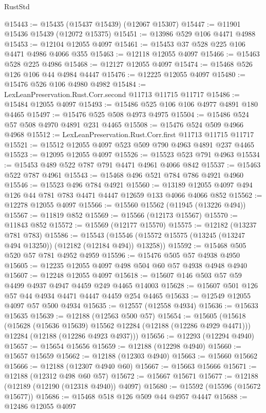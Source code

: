 \begin{lexlean}{RustStd}
\begin{coremodule}
{\begin{coremodule}
{{{{{{{{{{{{{{{{{{{{{{{{{{{{{{{{{{{{{{{{{{{{{{{{{{{{{{{{{{{{{{{{{{{{@15443 := @15435 (@15437 @15439) (@12067 @15307)
@15447 := @11901 @15436 @15439 (@12072 @15375)
@15451 := @13986 @529 @106 @4471 @4988
@15453 := @12104 @12055 @4097
@15461 := @15453 @37 @528 @225 @106 @4471 @4986 @4066 @355
@15463 := @12118 @12055 @4097
@15466 := @15463 @528 @225 @4986
@15468 := @12127 @12055 @4097
@15474 := @15468 @526 @126 @106 @44 @4984 @4447
@15476 := @12225 @12055 @4097
@15480 := @15476 @526 @106 @4980 @4982
@15484 := LexLeanPreservation.Rust.Corr.second @11713 @11715 @11717
@15486 := @15484 @12055 @4097
@15493 := @15486 @525 @106 @106 @4977 @4891 @180 @4465
@15497 := @15476 @525 @508 @4973 @4975
@15504 := @15486 @524 @57 @508 @4970 @4891 @231 @4465
@15508 := @15476 @524 @509 @4966 @4968
@15512 := LexLeanPreservation.Rust.Corr.first @11713 @11715 @11717
@15521 := @15512 @12055 @4097 @523 @509 @790 @4963 @4891 @237 @4465
@15523 := @12095 @12055 @4097
@15526 := @15523 @523 @791 @4963
@15534 := @15453 @489 @522 @787 @791 @4471 @4961 @4066 @842
@15537 := @15463 @522 @787 @4961
@15543 := @15468 @496 @521 @784 @786 @4921 @4960
@15546 := @15523 @496 @784 @4921
@15560 := @13189 @12055 @4097 @494 @126 @44 @781 @783 @4471 @4447 @12659 @133 @4066 @4066 @852
@15562 := @12278 @12055 @4097
@15566 := @15560 @15562 (@11945 (@13226 @494))
@15567 := @11819 @852
@15569 := @15566 (@12173 @15567)
@15570 := @11843 @852
@15572 := @15569 (@12177 @15570)
@15575 := @12182 (@13237 @781 @783)
@15586 := @15543
    (@15546 (@15572 @15575 (@13245 (@13247 @494 @13250)) (@12182 (@12184 @494)) @13258))
@15592 := @15468 @505 @520 @57 @781 @4952 @4959
@15596 := @15476 @505 @57 @4938 @4950
@15605 := @12235 @12055 @4097 @498 @504 @60 @57 @4938 @4948 @4940
@15607 := @12248 @12055 @4097
@15618 := @15607 @146 @503 @57 @59 @4499 @4937 @4947 @4459 @249 @4465 @14003
@15628 := @15607 @501 @126 @57 @44 @4934 @4471 @4447 @4459 @254 @4465
@15633 := @12549 @12055 @4097 @57 @500 @4934
@15635 := @12557 (@12558 @4934)
@15636 := @15633 @15635
@15639 := @12188 (@12563 @500 @57)
@15654 := @15605
    (@15618
      (@15628 (@15636 @15639) @15562 @12284 (@12188 (@12286 @4929 @4471)))
      @12284
      (@12188 (@12286 @4923 @4937)))
@15656 := @12293 (@12294 @4940)
@15657 := @15654 @15656
@15659 := @12188 (@12298 @4940)
@15660 := @15657 @15659
@15662 := @12188 (@12303 @4940)
@15663 := @15660 @15662
@15666 := @12188 (@12307 @4940 @60)
@15667 := @15663 @15666
@15671 := @12188 (@12312 @498 @60 @57)
@15672 := @15667 @15671
@15677 := @12188 (@12189 (@12190 (@12318 @4940)) @4097)
@15680 := @15592 (@15596 (@15672 @15677))
@15686 := @15468 @518 @126 @509 @44 @4957 @4447
@15688 := @12486 @12055 @4097
}}}}}}}}}}}}}}}}}}}}}}}}}}}}}}}}}}}}}}}}}}}}}}}}}}}}}}}}}}}}}}}}}}}}
\end{coremodule}}
\end{coremodule}
\end{lexlean}
